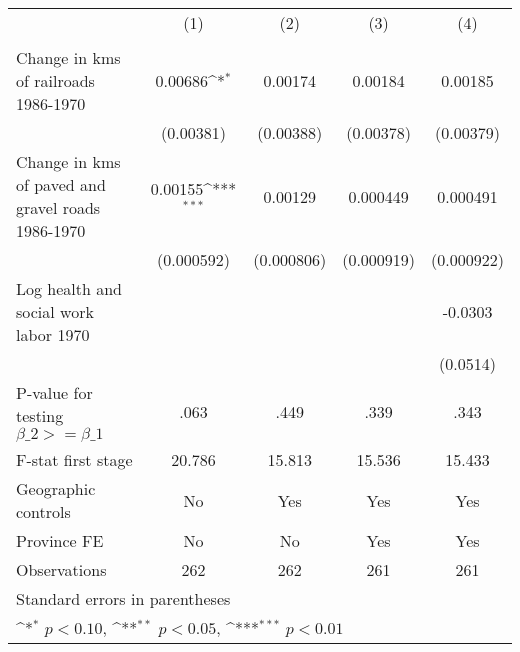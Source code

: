 {
\def\sym#1{\ifmmode^{#1}\else\(^{#1}\)\fi}
\begin{tabular}{l*{4}{c}}
\hline\hline
                &\multicolumn{1}{c}{(1)}&\multicolumn{1}{c}{(2)}&\multicolumn{1}{c}{(3)}&\multicolumn{1}{c}{(4)}\\
                &\multicolumn{1}{c}{}&\multicolumn{1}{c}{}&\multicolumn{1}{c}{}&\multicolumn{1}{c}{}\\
\hline
Change in kms of railroads 1986-1970&  0.00686\sym{*}  &  0.00174         &  0.00184         &  0.00185         \\
                &(0.00381)         &(0.00388)         &(0.00378)         &(0.00379)         \\
[1em]
Change in kms of paved and gravel roads 1986-1970&  0.00155\sym{***}&  0.00129         & 0.000449         & 0.000491         \\
                &(0.000592)         &(0.000806)         &(0.000919)         &(0.000922)         \\
[1em]
Log health and social work labor 1970&                  &                  &                  &  -0.0303         \\
                &                  &                  &                  & (0.0514)         \\
\hline
P-value for testing $\beta\_{2} >= \beta\_{1}$&     .063         &     .449         &     .339         &     .343         \\
F-stat first stage&   20.786         &   15.813         &   15.536         &   15.433         \\
Geographic controls&       No         &      Yes         &      Yes         &      Yes         \\
Province FE     &       No         &       No         &      Yes         &      Yes         \\
Observations    &      262         &      262         &      261         &      261         \\
\hline\hline
\multicolumn{5}{l}{\footnotesize Standard errors in parentheses}\\
\multicolumn{5}{l}{\footnotesize \sym{*} \(p<0.10\), \sym{**} \(p<0.05\), \sym{***} \(p<0.01\)}\\
\end{tabular}
}
